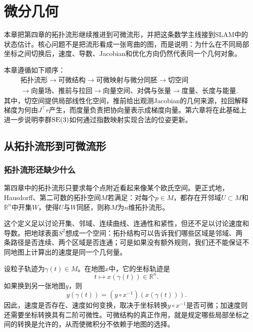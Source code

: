 \chapter{微分几何}
\label{chap:md-05}

\newenvironment{slamcase}[1]{%
    \par\noindent\textbf{\color{main}例：#1}\rmfamily\par
}{%
    \par\ignorespacesafterend
}

本章把第四章的拓扑流形继续推进到可微流形，并把这条数学主线接到SLAM中的状态估计。核心问题不是把流形看成一张弯曲的图，而是说明：为什么在不同局部坐标之间切换后，速度、导数、Jacobian和优化方向仍然代表同一个几何对象。

本章遵循如下顺序：
\[
\begin{aligned}
&\text{拓扑流形}
\longrightarrow \text{可微结构}
\longrightarrow \text{可微映射与微分同胚}
\longrightarrow \text{切空间} \\
&\longrightarrow \text{向量场、推前与拉回}
\longrightarrow \text{向量空间、对偶与张量}
\longrightarrow \text{度量、长度与能量}.
\end{aligned}
\]
其中，切空间提供局部线性化空间，推前给出观测Jacobian的几何来源，拉回解释梯度为何由$J^\top r$产生，而度量负责把协向量表示成梯度向量。第六章将在此基础上进一步说明李群$\operatorname{SE}(3)$如何通过指数映射实现合法的位姿更新。


\section{从拓扑流形到可微流形}

\subsection{拓扑流形还缺少什么}

第四章中的拓扑流形只要求每个点附近看起来像某个欧氏空间。更正式地，Hausdorff、第二可数的拓扑空间$M$若满足：对每个$p\in M$，都存在开邻域$U\subset M$和$\mathbb R^n$中开集$W$，使得$U$与$W$同胚，则称$M$为$n$维拓扑流形。

这个定义足以讨论开集、邻域、连续曲线、连通性和紧性，但还不足以讨论速度和导数。把地球表面$S^2$想成一个空间：拓扑结构可以告诉我们哪些区域是邻域、两条路径是否连续、两个区域是否连通；可是如果没有额外规则，我们还不能保证不同地图上计算出的速度是同一个几何量。

设粒子轨迹为$\gamma(t)\in M$。在地图$x$中，它的坐标轨迹是
\[
    t\longmapsto x(\gamma(t))\in\mathbb R^n.
\]
如果换到另一张地图$y$，则
\[
    y(\gamma(t))
    =(y\circ x^{-1})(x(\gamma(t))).
\]
因此，速度是否存在、速度如何变换，取决于坐标转换$y\circ x^{-1}$是否可微；加速度则还需要坐标转换具有二阶可微性。可微结构的真正作用，就是规定哪些局部坐标之间的转换是允许的，从而使微积分不依赖于地图的选择。

